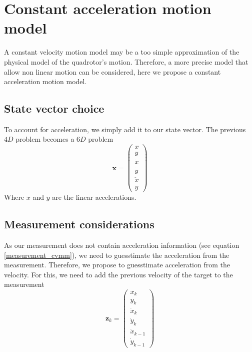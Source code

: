\documentclass[12pt]{article}
\begin{document}
\section{Constant acceleration motion model}
A constant velocity motion model may be a too simple approximation of the physical model of the quadrotor's motion.
Therefore, a more precise model that allow non linear motion can be considered, here we propose a constant acceleration motion model.

\subsection{State vector choice}
To account for acceleration, we simply add it to our state vector.
The previous $4D$ problem becomes a $6D$ problem
\begin{equation}
\mathbf{x} =
    \begin{pmatrix}
        x\\
        y\\
        \dot{x}\\
        \dot{y}\\
        \ddot{x}\\
        \ddot{y}
    \end{pmatrix}
\end{equation}
Where $\ddot{x}$ and $\ddot{y}$ are the linear accelerations.

\subsection{Measurement considerations}
As our measurement does not contain acceleration information (see equation \ref{measurement_cvmm}), we need to guesstimate the acceleration from the measurement.
Therefore, we propose to guesstimate acceleration from the velocity.
For this, we need to add the previous velocity of the target to the measurement
\begin{equation}
\mathbf{z}_k =
    \begin{pmatrix}
        x_k\\
        y_k\\
        \dot{x}_k\\
        \dot{y}_k\\
        \dot{x}_{k-1}\\
        \dot{y}_{k-1}
    \end{pmatrix}
\label{measurement_cvmm}
\end{equation}
\end{document}
